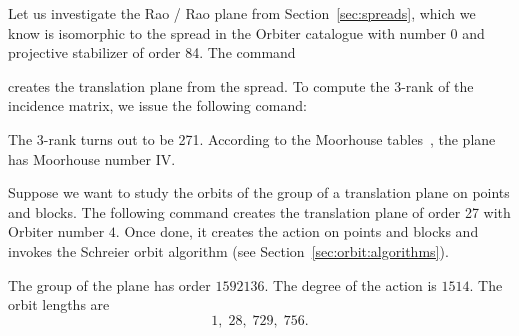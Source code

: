 \bigskip

Let us investigate the Rao / Rao plane from Section~\ref{sec:spreads}, 
which we know is isomorphic to the spread in the Orbiter catalogue 
with number 0 and projective stabilizer of order 84.
The command  


creates the translation plane from the spread.
To compute the 3-rank of the incidence matrix, we issue the following comand:


The 3-rank turns out to be 271. 
According to the Moorhouse tables~\cite{Moorhouse:tables:27}, 
the plane has Moorhouse number IV.

\bigskip

Suppose we want to study the orbits of the group of a translation plane on points and blocks. 
The following command creates the translation plane of order 27 with Orbiter number $4.$
Once done, it creates the action on points and blocks and 
invokes the Schreier orbit algorithm (see Section~\ref{sec:orbit:algorithms}).


The group of the plane has order $1592136.$
The degree of the action is $1514.$
The orbit lengths are
$$
1, \; 28, \; 729, \; 756.
$$

